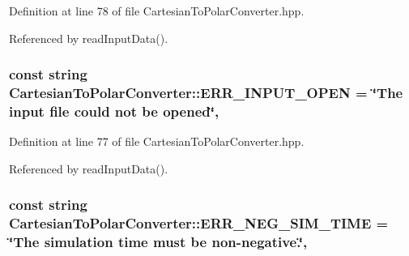 Definition at line 78 of file Cartesian\-To\-Polar\-Converter.\-hpp.



Referenced by read\-Input\-Data().

\hypertarget{classmultiscale_1_1video_1_1CartesianToPolarConverter_a298f7aba7ec17e486484fa2e52ebc109}{
\subsubsection[{E\-R\-R\-\_\-\-I\-N\-P\-U\-T\-\_\-\-O\-P\-E\-N}]{\setlength{\rightskip}{0pt plus 5cm}const string Cartesian\-To\-Polar\-Converter\-::\-E\-R\-R\-\_\-\-I\-N\-P\-U\-T\-\_\-\-O\-P\-E\-N = \char`\"{}The input file could not be opened\char`\"{}\hspace{0.3cm}{\ttfamily [static]}, {\ttfamily [private]}}}\label{classmultiscale_1_1video_1_1CartesianToPolarConverter_a298f7aba7ec17e486484fa2e52ebc109}


Definition at line 77 of file Cartesian\-To\-Polar\-Converter.\-hpp.



Referenced by read\-Input\-Data().

\hypertarget{classmultiscale_1_1video_1_1CartesianToPolarConverter_a0a3ab913d167193883dc96aed6cc8290}{
\subsubsection[{E\-R\-R\-\_\-\-N\-E\-G\-\_\-\-S\-I\-M\-\_\-\-T\-I\-M\-E}]{\setlength{\rightskip}{0pt plus 5cm}const string Cartesian\-To\-Polar\-Converter\-::\-E\-R\-R\-\_\-\-N\-E\-G\-\_\-\-S\-I\-M\-\_\-\-T\-I\-M\-E = \char`\"{}The simulation time must be non-\/negative.\char`\"{}\hspace{0.3cm}{\ttfamily [static]}, {\ttfamily [private]}}}\label{classmultiscale_1_1video_1_1CartesianToPolarConverter_a0a3ab913d167193883dc96aed6cc8290}


